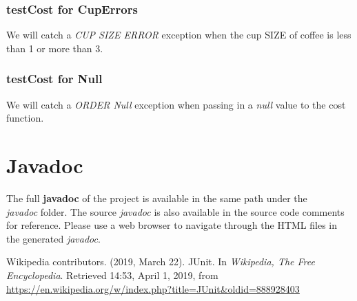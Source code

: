 \documentclass[a4paper]{report}
\begin{document}
\subsection{testCost for CupErrors}
\par We will catch a \emph{CUP SIZE ERROR} exception when the cup SIZE of coffee is less than 1 or more than 3.

\subsection{testCost for Null}
\par We will catch a \emph{ORDER Null} exception when passing in a \emph{null} value to the cost function.
\chapter{Javadoc}
The full \textbf{javadoc} of the project is available in the same path under the \emph{\\javadoc} folder. The source \emph{javadoc} is also available in the source code comments for reference. Please use a web browser to navigate through the HTML files in the generated \emph{javadoc}.
\begin{thebibliography}{A}

Wikipedia contributors. (2019, March 22). JUnit. In \emph{Wikipedia, The Free Encyclopedia}. Retrieved 14:53, April 1, 2019, from \url{https://en.wikipedia.org/w/index.php?title=JUnit&oldid=888928403}

\end{thebibliography}
\end{document}
